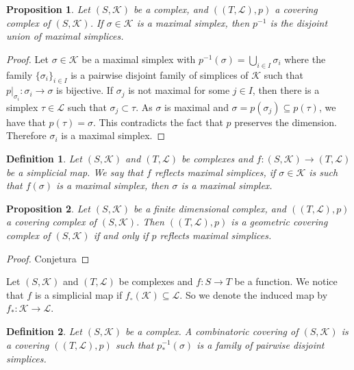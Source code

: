 \documentclass{amsart}
\newtheorem{proposition}{Proposition}[section]
\newtheorem{definition}{Definition}[section]
\begin{document}
\begin{proposition}
Let $(S,\mathcal{K})$ be a complex, and $((T,\mathcal{L}),p)$ a covering complex of $(S,\mathcal{K})$. If $\sigma\in\mathcal{K}$ is a maximal simplex, then $p^{-1}$ is the disjoint union of maximal simplices.
\end{proposition}

\begin{proof}
Let $\sigma\in\mathcal{K}$ be a maximal simplex with  $p^{-1}(\sigma)=\bigcup_{i\in I}\sigma_i$ where the family $\{\sigma_i\}_{i\in I}$ is a pairwise disjoint family of simplices of $\mathcal{K}$ such that $p|_{\sigma_i}\colon \sigma_i\longrightarrow \sigma$ is bijective. If $\sigma_j$ is not maximal for some $j\in I$, then there is a simplex $\tau\in\mathcal{L}$ such that $\sigma_j\subset \tau$. As $\sigma$ is maximal and $\sigma=p(\sigma_j)\subseteq p(\tau)$, we have that $p(\tau)=\sigma$. This contradicts the fact that $p$ preserves the dimension. Therefore $\sigma_i$ is a maximal simplex.
\end{proof}

\begin{definition}
Let  $(S,\mathcal{K})$ and $(T,\mathcal{L})$ be complexes and $f\colon (S,\mathcal{K})\longrightarrow (T,\mathcal{L})$ be a simplicial map. We say that $f$ reflects maximal simplices, if $\sigma\in\mathcal{K}$ is such that $f(\sigma)$ is a maximal simplex, then $\sigma$ is a maximal simplex.
\end{definition}


\begin{proposition}
Let $(S,\mathcal{K})$ be a finite dimensional complex, and $((T,\mathcal{L}),p)$ a covering complex of $(S,\mathcal{K})$. Then $((T,\mathcal{L}),p)$ is a geometric covering complex of $(S,\mathcal{K})$ if and only if $p$ reflects maximal simplices.
\end{proposition}

\begin{proof}
Conjetura
\end{proof}

Let $(S,\mathcal{K})$ and $(T,\mathcal{L})$ be complexes and $f\colon S\longrightarrow T$ be a function. We notice that $f$ is a simplicial map if $f_\circ(\mathcal{K})\subseteq\mathcal{L}$. So we denote the induced map by $f_*\colon \mathcal{K}\longrightarrow\mathcal{L}$.

\begin{definition}
Let $(S,\mathcal{K})$ be a complex. A combinatoric covering of $(S,\mathcal{K})$ is a covering $((T,\mathcal{L}),p)$ such that $p_*^{-1}(\sigma)$ is a family of pairwise disjoint simplices.
\end{definition}
\end{document}
